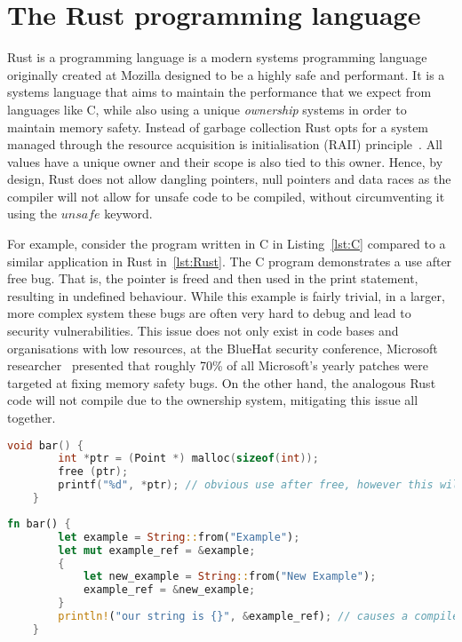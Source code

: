 \section{The Rust programming language}

Rust is a programming language is a modern systems programming language originally created at Mozilla designed to be a highly safe and performant.
It is a systems language that aims to maintain the performance that we expect from languages like C, while also using a unique \textit{ownership} systems in order to maintain memory safety.
Instead of garbage collection Rust opts for a system managed through the resource acquisition is initialisation (RAII) principle~\citep{rust_raii_2021}.
All values have a unique owner and their scope is also tied to this owner.
Hence, by design, Rust does not allow dangling pointers, null pointers and data races as the compiler will not allow for unsafe code to be compiled, without circumventing it using the $unsafe$ keyword.

For example, consider the program written in C in Listing~\ref{lst:C} compared to a similar application in Rust in~\ref{lst:Rust}.
The C program demonstrates a use after free bug.
That is, the pointer is freed and then used in the print statement, resulting in undefined behaviour.
While this example is fairly trivial, in a larger, more complex system these bugs are often very hard to debug and lead to security vulnerabilities.
This issue does not only exist in code bases and organisations with low resources, at the BlueHat security conference, Microsoft researcher~\cite{miller_msrc-security-research2019_02_2019} presented that roughly 70\% of all Microsoft's yearly patches were targeted at fixing memory safety bugs.
On the other hand, the analogous Rust code will not compile due to the ownership system, mitigating this issue all together.

\begin{lstlisting}[language=C, float, caption={An example of a use after free in C code. This is an incorrect use of dynamic memory management, however it compiles. In large, complex code bases, missing bugs such as these often happens and can cause exploitable security issues.}, label=lst:C]
    void bar() {
        int *ptr = (Point *) malloc(sizeof(int));
        free (ptr);
        printf("%d", *ptr); // obvious use after free, however this will compile
    }
\end{lstlisting}

\begin{lstlisting}[language=Rust, float, caption={A similar application in Rust will not compile due to the safety guaranteed by the ownership system. A borrow occurs when $example\_ref$ is assigned to point to $new\_example$, however the ownership system recognises that the borrowed value does not live long enough.}, label=lst:Rust]
    fn bar() {
        let example = String::from("Example");
        let mut example_ref = &example;
        {
            let new_example = String::from("New Example");
            example_ref = &new_example;
        }
        println!("our string is {}", &example_ref); // causes a compiler error in Rust: error `new_example` does not live long enough
    }
\end{lstlisting}

